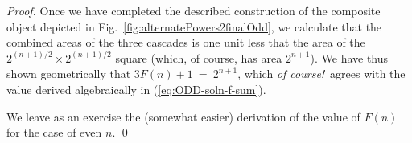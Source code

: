 \begin{proof}
Once we have completed the described construction of the composite
object depicted in Fig.~\ref{fig:alternatePowers2finalOdd}, we
calculate that the combined areas of the three cascades is one unit
less that the area of the $2^{(n+1)/2} \times 2^{(n+1)/2}$ square
(which, of course, has area $2^{n+1}$).  We have thus shown
geometrically that $3 F(n)+1 \ = \ 2^{n+1}$, which {\em of
  course!}~agrees with the value derived algebraically in
(\ref{eq:ODD-soln-f-sum}).

\bigskip

We leave as an exercise the (somewhat easier) derivation of the value
of $F(n)$ for the case of even $n$.
\qed
\end{proof}


%
%
%
%
%
%


